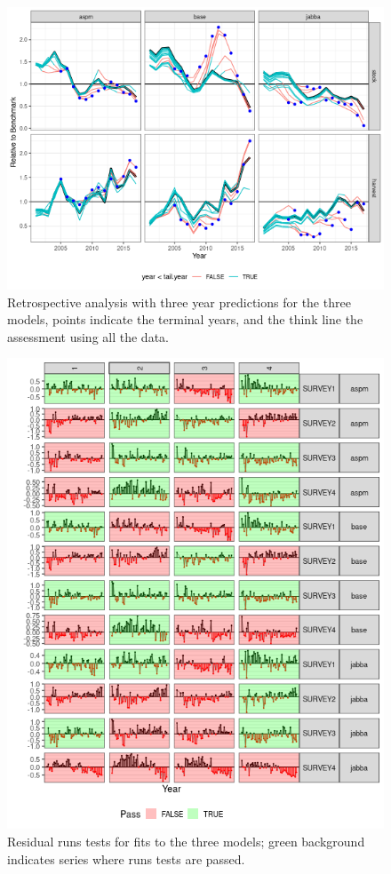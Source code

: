 \documentclass[a4paper]{article}
\begin{document}
\begin{figure}[htbp]
\centering
\includegraphics[width=6in]{final-retro3-1.png}
\caption{Retrospective analysis with three year predictions for the three models, points indicate the terminal years, and the think line the assessment using all the data.}
\label{fig:predictions}
\end{figure}


\begin{figure}[htbp]
\centering
\includegraphics[width=6in]{final-cpue-residual-runs-1.png}
\caption{Residual runs tests for fits to the three models; green background indicates series where runs tests are passed.}
\label{fig:runs}
\end{figure}
\end{document}
